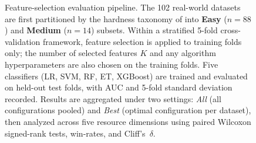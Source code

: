 \begin{figure}[tbp]
{\begin{tikzpicture}
\end{tikzpicture}%
}
\caption{Feature-selection evaluation pipeline.
  The 102 real-world datasets are first partitioned by the hardness taxonomy of
  \citet{elmakias2025choosing} into \textbf{Easy} ($n=88$) and
  \textbf{Medium} ($n=14$) subsets.
  Within a stratified 5-fold cross-validation framework, feature
  selection is applied to training folds only; the number of selected
  features $K$ and any algorithm hyperparameters are also chosen on
  the training folds.
  Five classifiers (LR, SVM, RF, ET, XGBoost) are trained and evaluated
  on held-out test folds, with AUC and 5-fold standard deviation recorded.
  Results are aggregated under two settings: \emph{All} (all configurations
  pooled) and \emph{Best} (optimal configuration per dataset), then analyzed
  across five resource dimensions using paired Wilcoxon signed-rank tests,
  win-rates, and Cliff's~$\delta$.}
\label{fig:fs_pipeline}
\end{figure}
